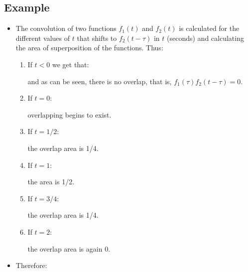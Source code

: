 \subsection*{Example}
\begin{itemize}
\item The convolution of two functions $f_1(t)$ and $f_2(t)$ is
  calculated for the different values of $t$ that shifts to
  $f_2(t-\tau)$ in $t$ (seconds) and calculating the area of
  superposition of the functions. Thus:
  \begin{enumerate}
    \item If $t<0$ we get that:
      \begin{center}
      \end{center}
      and as can be seen, there is no overlap, that is,
      $f_1(\tau)f_2(t-\tau)=0$.
    \item If $t=0$:
      \begin{center}
      \end{center}
      overlapping begins to exist.
    \item If $t=1/2$:
      \begin{center}
      \end{center}
      the overlap area is 1/4.
    \item If $t=1$:
      \begin{center}
      \end{center}
      the area is 1/2.
    \item If $t=3/4$:
      \begin{center}
      \end{center}
      the overlap area is 1/4.
    \item If $t=2$:
      \begin{center}
      \end{center}
      the overlap area is again 0.
  \end{enumerate}
\item Therefore:
  \begin{center}
  \end{center}
\end{itemize}

